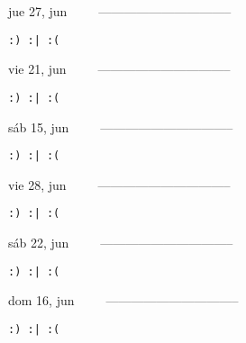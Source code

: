 \documentclass[letterpaper,10pt]{article}
\begin{document}
\begin{multicols}{3}
{jue 27, jun\ \ \ \ \ --------------------------------}
\begin{flushright}\begin{small}\texttt{:) :| :(}\end{small}\end{flushright}
\vfill
{vie 21, jun\ \ \ \ \ --------------------------------}
\begin{flushright}\begin{small}\texttt{:) :| :(}\end{small}\end{flushright}\par
\vfill
{sáb 15, jun\ \ \ \ \ --------------------------------}
\begin{flushright}\begin{small}\texttt{:) :| :(}\end{small}\end{flushright}\par
\vfill
\end{multicols}
\vspace{1.05cm}

\begin{multicols}{3}
{vie 28, jun\ \ \ \ \ --------------------------------}
\begin{flushright}\begin{small}\texttt{:) :| :(}\end{small}\end{flushright}
\vfill
{sáb 22, jun\ \ \ \ \ --------------------------------}
\begin{flushright}\begin{small}\texttt{:) :| :(}\end{small}\end{flushright}\par
\vfill
{dom 16, jun\ \ \ \ \ --------------------------------}
\begin{flushright}\begin{small}\texttt{:) :| :(}\end{small}\end{flushright}\par
\vfill
\end{multicols}
\vspace{1.05cm}
\end{document}
